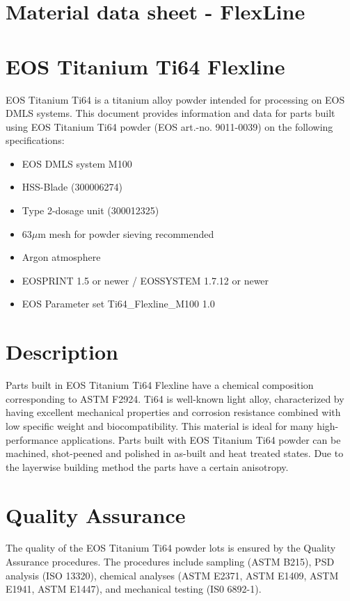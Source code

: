 \documentclass[10pt]{article}
\begin{document}
\section*{Material data sheet - FlexLine}
\section*{EOS Titanium Ti64 Flexline}
EOS Titanium Ti64 is a titanium alloy powder intended for processing on EOS DMLS systems. This document provides information and data for parts built using EOS Titanium Ti64 powder (EOS art.-no. 9011-0039) on the following specifications:

\begin{itemize}
  \item EOS DMLS system M100
  \item HSS-Blade (300006274)
  \item Type 2-dosage unit (300012325)
  \item $63 \mu \mathrm{m}$ mesh for powder sieving recommended
  \item Argon atmosphere
  \item EOSPRINT 1.5 or newer / EOSSYSTEM 1.7.12 or newer
  \item EOS Parameter set Ti64\_Flexline\_M100 1.0
\end{itemize}

\section*{Description}
Parts built in EOS Titanium Ti64 Flexline have a chemical composition corresponding to ASTM F2924. Ti64 is well-known light alloy, characterized by having excellent mechanical properties and corrosion resistance combined with low specific weight and biocompatibility. This material is ideal for many high-performance applications. Parts built with EOS Titanium Ti64 powder can be machined, shot-peened and polished in as-built and heat treated states. Due to the layerwise building method the parts have a certain anisotropy.

\section*{Quality Assurance}
The quality of the EOS Titanium Ti64 powder lots is ensured by the Quality Assurance procedures. The procedures include sampling (ASTM B215), PSD analysis (ISO 13320), chemical analyses (ASTM E2371, ASTM E1409, ASTM E1941, ASTM E1447), and mechanical testing (IS0 6892-1).
\end{document}
